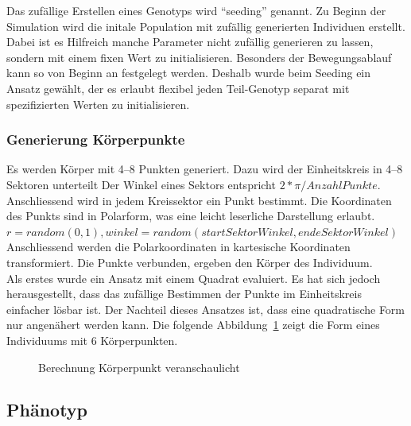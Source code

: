 
        Das zufällige Erstellen eines Genotyps wird ``seeding'' genannt.
        Zu Beginn der Simulation wird die initale Population mit zufällig generierten Individuen erstellt.
        Dabei ist es Hilfreich manche Parameter nicht zufällig generieren zu lassen,
        sondern mit einem fixen Wert zu initialisieren.
        Besonders der Bewegungsablauf kann so von Beginn an festgelegt werden.
        Deshalb wurde beim Seeding ein Ansatz gewählt, der es erlaubt flexibel jeden Teil-Genotyp separat mit
        spezifizierten Werten zu initialisieren.

      \subsubsection{Generierung Körperpunkte\label{subsub:GenotypGenerierungKörperpunkte}}

        Es werden Körper mit 4--8 Punkten generiert.
        Dazu wird der Einheitskreis in 4--8 Sektoren unterteilt
        Der Winkel eines Sektors entspricht \( 2 * \pi / Anzahl Punkte\).
        \\
        Anschliessend wird in jedem Kreissektor ein Punkt bestimmt.
        Die Koordinaten des Punkts sind in Polarform, was eine leicht leserliche Darstellung erlaubt.
        \\
        \( r = random (0, 1), winkel = random(startSektorWinkel, endeSektorWinkel) \)
        Anschliessend werden die Polarkoordinaten in kartesische Koordinaten transformiert.
        Die Punkte verbunden, ergeben den Körper des Individuum.
        \\
        Als erstes wurde ein Ansatz mit einem Quadrat evaluiert.
        Es hat sich jedoch herausgestellt,
        dass das zufällige Bestimmen der Punkte im Einheitskreis einfacher lösbar ist.
        Der Nachteil dieses Ansatzes ist, dass eine quadratische Form nur angenähert werden kann.
        Die folgende Abbildung~\ref{fig:kp} zeigt die Form eines Individuums mit 6 Körperpunkten.
        \\
        \begin{figure}[H]
          
          \caption{Berechnung Körperpunkt veranschaulicht\label{fig:kp}}
        \end{figure}

    \subsection{Phänotyp\label{sub:Phenotyp}}

